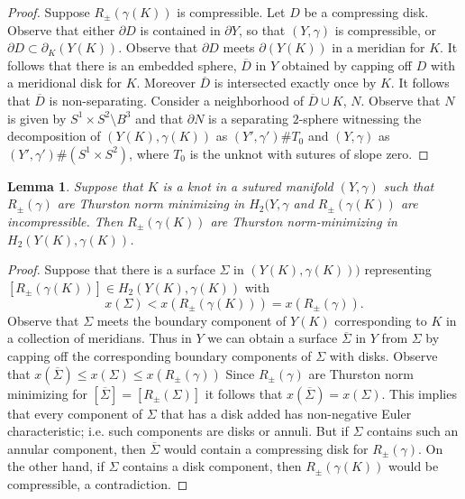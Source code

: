 \documentclass{amsart}
\newtheorem{lemma}[theorem]{Lemma}
\theoremstyle{definition}
\theoremstyle{remark}
\numberwithin{equation}{section}
\begin{document}
\begin{proof}
    Suppose $R_\pm(\gamma(K))$ is compressible. Let $D$ be a compressing disk. Observe that either $\partial D$ is contained in $\partial Y$, so that $(Y,\gamma)$ is compressible, or $\partial D\subset\partial_K(Y(K))$. Observe that $\partial D$ meets $\partial(Y(K))$ in a meridian for $K$. It follows that there is an embedded sphere, $\overline{D}$ in $Y$ obtained by capping off $D$ with a meridional disk for $K$. Moreover $\overline{D}$ is intersected exactly once by $K$. It follows that $\overline{D}$ is non-separating. Consider a neighborhood of $\overline{D}\cup K$, $N$. Observe that $N$ is given by $S^1\times  S^2\setminus B^3$ and that $\partial N$ is a separating $2$-sphere witnessing the decomposition of $(Y(K),\gamma(K))$ as $(Y',\gamma')\#T_0$ and $(Y,\gamma)$ as $(Y',\gamma')\# (S^1\times  S^2)$, where $T_0$ is the unknot with sutures of slope zero.
\end{proof}




\begin{lemma}
    Suppose that $K$ is a knot in a sutured manifold $(Y,\gamma)$ such that $R_\pm(\gamma)$ are Thurston norm minimizing in $H_2(Y,\gamma$ and $R_\pm(\gamma(K))$ are incompressible. Then $R_\pm(\gamma(K))$ are Thurston norm-minimizing in $H_2(Y(K),\gamma(K))$.
\end{lemma}

\begin{proof}
    Suppose that there is a surface $\Sigma$ in $(Y(K),\gamma(K)))$ representing $[R_\pm(\gamma(K))]\in H_2(Y(K),\gamma(K))$ with $$x(\Sigma)< x(R_\pm(\gamma(K)))=x(R_\pm(\gamma)).$$ Observe that $\Sigma$ meets the boundary component of $Y(K)$ corresponding to $K$ in a collection of meridians. Thus in $Y$ we can obtain a surface $\overline{\Sigma}$ in $Y$ from $\Sigma$ by capping off the corresponding boundary components of $\Sigma$ with disks. Observe that $x(\overline{\Sigma})\leq x(\Sigma)\leq x(R_\pm(\gamma))$ Since $R_\pm(\gamma)$ are Thurston norm minimizing for $[\overline{\Sigma}]=[R_\pm(\Sigma)]$ it follows that $x(\overline{\Sigma})=x(\Sigma)$. This implies that every component of $\Sigma$ that has a disk added has non-negative Euler characteristic; i.e. such components are disks or annuli. But if $\Sigma$ contains such an annular component, then $\overline{\Sigma}$ would contain a compressing disk for $R_\pm(\gamma)$. On the other hand, if $\Sigma$ contains a disk component, then $R_\pm(\gamma(K))$ would be compressible, a contradiction.
\end{proof}
\end{document}
